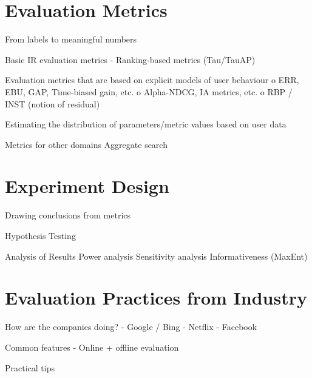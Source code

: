 \documentclass[openany]{now} %
\begin{document}
\chapter{Evaluation Metrics}
From labels to meaningful numbers


Basic IR evaluation metrics 
-	Ranking-based metrics (Tau/TauAP)

Evaluation metrics that are based on explicit models of user behaviour
o	ERR, EBU, GAP, Time-biased gain, etc.
o	Alpha-NDCG, IA metrics, etc.
o	RBP / INST (notion of residual)

Estimating the distribution of parameters/metric values based on user data

Metrics for other domains
Aggregate search \cite{Zhou:2013}

\chapter{Experiment Design}
Drawing conclusions from metrics

Hypothesis Testing
\cite{Dincer:2014}

Analysis of Results
Power analysis
Sensitivity analysis
Informativeness (MaxEnt)
\cite{Bron:2013} \cite{Urbano:2013} \cite{Boytsov:2013} \cite{Sakai:2014} \cite{Robertson:2012}



\chapter{Evaluation Practices from Industry}
How are the companies doing?
-	Google / Bing
-	Netflix \cite{gunawardana2015evaluating} \cite{Gomez-Uribe2015}
-	Facebook

Common features
- Online + offline evaluation

Practical tips


\backmatter  %



	
\end{document}
